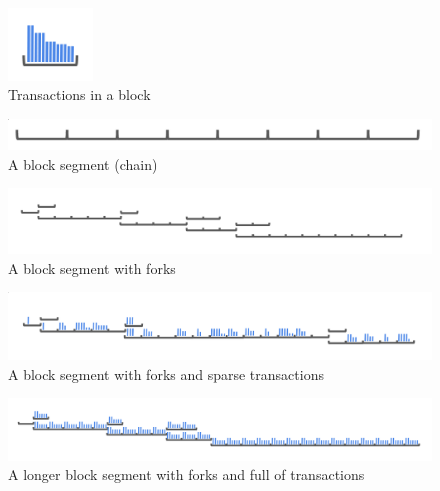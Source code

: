 \documentclass[11pt]{article}
\theoremstyle{plain}
\begin{document}
\begin{figure}[tph]
\centering
\includegraphics[width=0.2\textwidth]{vis_blocktxs.png}
\caption{Transactions in a block}
\label{fig:blocktxs}
\end{figure}

\begin{figure}[tph]
\centering
\includegraphics[width=1.0\textwidth]{vis_blocksegment.png}
\caption{A block segment (chain)}
\label{fig:blocksegment}
\end{figure}

\begin{figure}[tph]
\centering
\includegraphics[width=1.0\textwidth]{vis_blocksegment_forking.png}
\caption{A block segment with forks}
\label{fig:blocksegment_forks}
\end{figure}

\begin{figure}[tph]
\centering
\includegraphics[width=1.0\textwidth]{vis_blocksegment_forking_txs_sparse.png}
\caption{A block segment with forks and sparse transactions}
\label{fig:blocksegment_forks_txs_sparse}
\end{figure}

\begin{figure}[tph]
\centering
\includegraphics[width=1.0\textwidth]{vis_blocksegment_forking_txs_full.png}
\caption{A longer block segment with forks and full of transactions}
\label{fig:blocksegment_forks_txs_full}
\end{figure}
\end{document}
